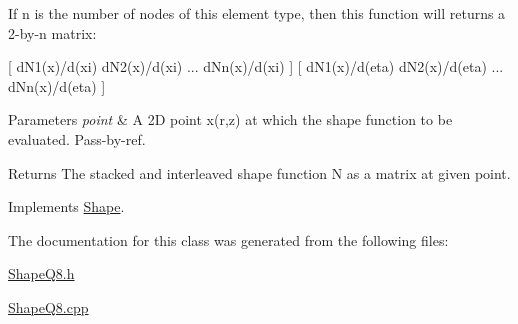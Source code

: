 If n is the number of nodes of this element type, then this function will returns a 2-\/by-\/n matrix\+:

\mbox{[} d\+N1(x)/d(xi) d\+N2(x)/d(xi) ... d\+Nn(x)/d(xi) \mbox{]} \mbox{[} d\+N1(x)/d(eta) d\+N2(x)/d(eta) ... d\+Nn(x)/d(eta) \mbox{]}


\begin{DoxyParams}{Parameters}
{\em point} & A 2D point x(r,z) at which the shape function to be evaluated. Pass-\/by-\/ref. \\
\hline
\end{DoxyParams}
\begin{DoxyReturn}{Returns}
The stacked and interleaved shape function N as a matrix at given point. 
\end{DoxyReturn}


Implements \mbox{\hyperlink{class_shape_a55575394f656e3ee4b5ac37ea04af8c9}{Shape}}.



The documentation for this class was generated from the following files\+:\begin{DoxyCompactItemize}
\item 
\mbox{\hyperlink{_shape_q8_8h}{Shape\+Q8.\+h}}\item 
\mbox{\hyperlink{_shape_q8_8cpp}{Shape\+Q8.\+cpp}}\end{DoxyCompactItemize}
